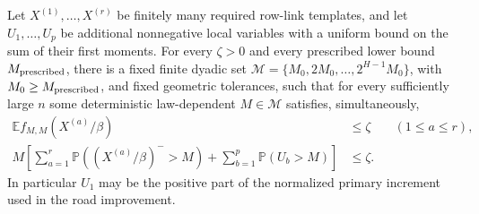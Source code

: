 \begin{proposition}
\label{links:matched}
Let \(X^{(1)},\ldots,X^{(r)}\) be finitely many required row-link
templates, and let \(U_1,\ldots,U_p\) be additional nonnegative local
variables with a uniform bound on the sum of their first moments.
For every \(\zeta>0\) and every prescribed lower bound
\(M_{\rm prescribed}\), there is a fixed finite dyadic set
\(\mathcal M=\{M_0,2M_0,\ldots,2^{H-1}M_0\}\), with
\(M_0\ge M_{\rm prescribed}\), and fixed geometric tolerances, such
that for every sufficiently large \(n\) some deterministic law-dependent
\(M\in\mathcal M\) satisfies, simultaneously,
\begin{align}
 \mathbb E f_{M,M}(X^{(a)}/\beta)&\le\zeta
       &&(1\le a\le r),\label{links:matched-mean}\\
 M\left[\sum_{a=1}^r\mathbb P((X^{(a)}/\beta)^->M)
       +\sum_{b=1}^p\mathbb P(U_b>M)\right]&\le\zeta.
 \label{links:matched-tail}
\end{align}
In particular \(U_1\) may be the positive part of the normalized
primary increment used in the road improvement.
\end{proposition}

